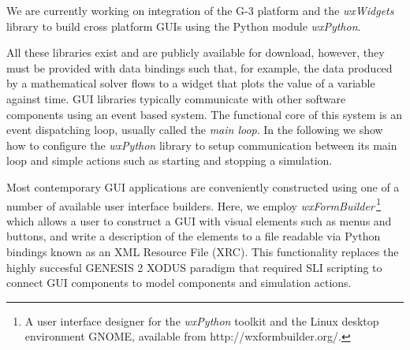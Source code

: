 \documentclass[12pt]{article}
\begin{document}
We are currently working on integration of the G-3 platform and the {\it wxWidgets}
library to build cross platform GUIs using the Python module {\it
  wxPython}. 

%
%

All these libraries exist and are publicly available for download,
however, they must be provided with data bindings such that, for
example, the data produced by a mathematical solver flows to a widget
that plots the value of a variable against time.
GUI libraries typically communicate with other software components
using an event based system.  The functional core of this system is an
event dispatching loop, usually called the {\it main loop}.  In the
following we show how to configure the {\it wxPython} library to setup
communication between its main loop and simple actions such as
starting and stopping a simulation.

Most contemporary GUI applications are conveniently constructed using
one of a number of available user interface builders.  Here, we employ {\it wxFormBuilder}\,\footnote{A user interface designer for the {\it wxPython}
toolkit and the Linux desktop environment GNOME, available from
http://wxformbuilder.org/.} which allows a user to construct a GUI with visual elements such as
menus and buttons, and write a description of the elements to a file
readable via Python
bindings known as an XML Resource File (XRC).  This functionality replaces the highly succesful GENESIS 2
XODUS paradigm that required SLI scripting to connect GUI components
to model components and simulation actions.


\end{document}
